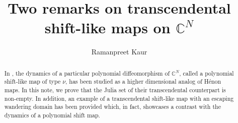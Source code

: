 \documentclass[12pt, reqno]{amsart}
\date{}
\numberwithin{equation}{section}
\theoremstyle{definition}
\theoremstyle{remark}
\theoremstyle{plain}
\theoremstyle{definition}
\numberwithin{equation}{section}
\begin{document}
\title[Two remarks on transcendental shift-like maps on $\mathbb{C}^N$]{Two remarks on transcendental shift-like maps on $\mathbb{C}^N$} 
\author{Ramanpreet Kaur}
\address{Department of Mathematics, Institute of Mathematics and Applications, Bhubaneswar-751029, India}


\begin{abstract}
In \cite{Bedford}, the dynamics of a particular polynomial diffeomorphism of $\mathbb{C}^N$, called a polynomial shift-like map of type $\nu$, has been studied as a higher dimensional analog of H\'enon maps. In this note, we prove that the Julia set of their transcendental counterpart is non-empty. In addition, an example of a transcendental shift-like map with an escaping wandering domain has been provided which, in fact, showcases a contrast with the dynamics of a polynomial shift map.
\end{abstract}
\maketitle


\vspace{-0.7cm}
\end{document}
